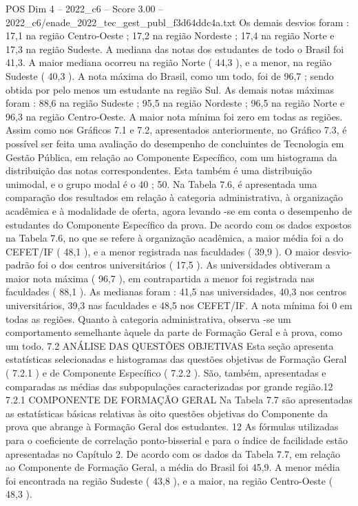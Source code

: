 \begin{textsample}{POS Dim 4 – 2022\_c6 – Score 3.00 – 2022\_c6/enade\_2022\_tec\_gest\_publ\_f3d64ddc4a.txt}
Os demais desvios foram : 17,1 na região Centro-Oeste ; 17,2 na região Nordeste ; 17,4 na região Norte e 17,3 na região Sudeste.
A mediana das notas dos estudantes de todo o Brasil foi 41,3.
A maior mediana ocorreu na região Norte ( 44,3 ), e a menor, na região Sudeste ( 40,3 ).
A nota máxima do Brasil, como um todo, foi de 96,7 ; sendo obtida por pelo menos um estudante na região Sul.
As demais notas máximas foram : 88,6 na região Sudeste ; 95,5 na região Nordeste ; 96,5 na região Norte e 96,3 na região Centro-Oeste.
A maior nota mínima foi zero em todas as regiões.
Assim como nos Gráficos 7.1 e 7.2, apresentados anteriormente, no Gráfico 7.3, é possível ser feita uma avaliação do desempenho de concluintes de Tecnologia em Gestão Pública, em relação ao Componente Específico, com um histograma da distribuição das notas correspondentes.
Esta também é uma distribuição unimodal, e o grupo modal é o 40 ; 50.
Na Tabela 7.6, é apresentada uma comparação dos resultados em relação à categoria administrativa, à organização acadêmica e à modalidade de oferta, agora levando -se em conta o desempenho de estudantes do Componente Específico da prova.
De acordo com os dados expostos na Tabela 7.6, no que se refere à organização acadêmica, a maior média foi a do CEFET/IF ( 48,1 ), e a menor registrada nas faculdades ( 39,9 ).
O maior desvio-padrão foi o dos centros universitários ( 17,5 ).
As universidades obtiveram a maior nota máxima ( 96,7 ), em contrapartida a menor foi registrada nas faculdades ( 88,1 ).
As medianas foram : 41,5 nas universidades, 40,3 nos centros universitários, 39,3 nas faculdades e 48,5 nos CEFET/IF.
A nota mínima foi 0 em todas as regiões.
Quanto à categoria administrativa, observa -se um comportamento semelhante àquele da parte de Formação Geral e à prova, como um todo. 7.2 ANÁLISE DAS QUESTÕES OBJETIVAS Esta seção apresenta estatísticas selecionadas e histogramas das questões objetivas de Formação Geral ( 7.2.1 ) e de Componente Específico ( 7.2.2 ).
São, também, apresentadas e comparadas as médias das subpopulações caracterizadas por grande região.12 7.2.1 COMPONENTE DE FORMAÇÃO GERAL Na Tabela 7.7 são apresentadas as estatísticas básicas relativas às oito questões objetivas do Componente da prova que abrange à Formação Geral dos estudantes. 12 As fórmulas utilizadas para o coeficiente de correlação ponto-bisserial e para o índice de facilidade estão apresentadas no Capítulo 2.
De acordo com os dados da Tabela 7.7, em relação ao Componente de Formação Geral, a média do Brasil foi 45,9.
A menor média foi encontrada na região Sudeste ( 43,8 ), e a maior, na região Centro-Oeste ( 48,3 ).

\end{textsample}
